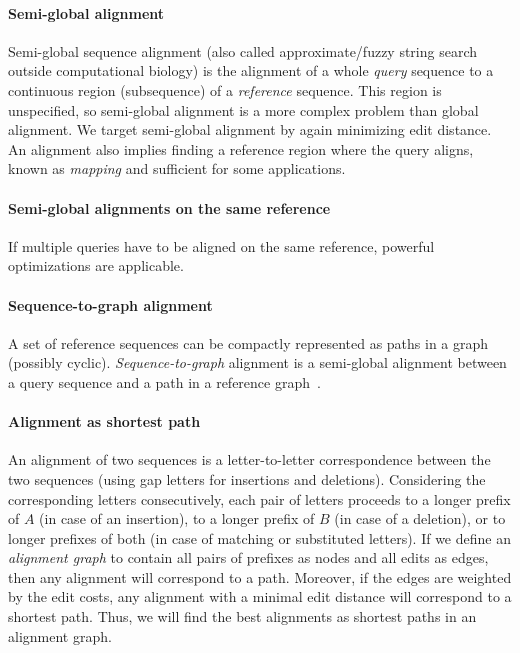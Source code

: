 \paragraph{Semi-global alignment}
Semi-global sequence alignment (also called approximate/fuzzy string search
outside computational biology) is the alignment of a whole \emph{query} sequence
to a continuous region (subsequence) of a \emph{reference} sequence. This region
is unspecified, so semi-global alignment is a more complex problem than global
alignment. We target semi-global alignment by again minimizing edit distance. An
alignment also implies finding a reference region where the query aligns, known
as \emph{mapping} and sufficient for some applications.

\paragraph{Semi-global alignments on the same reference}
If multiple queries have to be aligned on the same reference, powerful
optimizations are applicable.

\paragraph{Sequence-to-graph alignment}
A set of reference sequences can be compactly represented as paths in a graph
(possibly cyclic). \emph{Sequence-to-graph} alignment is a semi-global alignment
between a query sequence and a path in a reference
graph~\cite{jain_complexity_2019}.

\paragraph{Alignment as shortest path}
An alignment of two sequences is a letter-to-letter correspondence between the
two sequences (using gap letters for insertions and deletions). Considering the
corresponding letters consecutively, each pair of letters proceeds to a longer
prefix of $A$ (in case of an insertion), to a longer prefix of $B$ (in case of a
deletion), or to longer prefixes of both (in case of matching or substituted
letters). If we define an \emph{alignment graph} to contain all pairs of
prefixes as nodes and all edits as edges, then any alignment will correspond to
a path. Moreover, if the edges are weighted by the edit costs, any alignment
with a minimal edit distance will correspond to a shortest path. Thus, we will
find the best alignments as shortest paths in an alignment graph.

